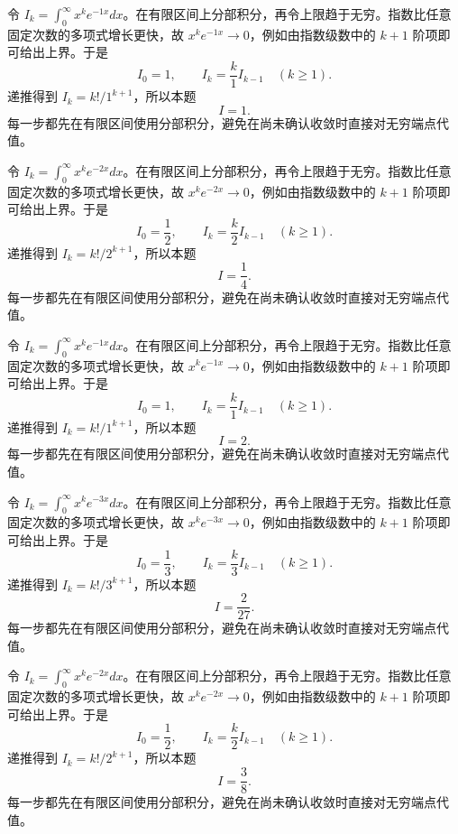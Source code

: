 \documentclass[UTF8,12pt,a4paper,fontset=fandol]{ctexart}
\begin{document}
\begin{solve}\label{ans:c19q20}
令 $I_k=\int_0^\infty x^ke^{-1x}dx$。在有限区间上分部积分，再令上限趋于无穷。指数比任意固定次数的多项式增长更快，故 $x^ke^{-1x}\to0$，例如由指数级数中的 $k+1$ 阶项即可给出上界。于是
\[
I_0=1,\qquad I_k=\frac k{1}I_{k-1}\quad(k\ge1).
\]
递推得到 $I_k=k!/1^{k+1}$，所以本题
\[
I=1.
\]
每一步都先在有限区间使用分部积分，避免在尚未确认收敛时直接对无穷端点代值。
\end{solve}

\begin{solve}\label{ans:c19q21}
令 $I_k=\int_0^\infty x^ke^{-2x}dx$。在有限区间上分部积分，再令上限趋于无穷。指数比任意固定次数的多项式增长更快，故 $x^ke^{-2x}\to0$，例如由指数级数中的 $k+1$ 阶项即可给出上界。于是
\[
I_0=\frac{1}{2},\qquad I_k=\frac k{2}I_{k-1}\quad(k\ge1).
\]
递推得到 $I_k=k!/2^{k+1}$，所以本题
\[
I=\frac{1}{4}.
\]
每一步都先在有限区间使用分部积分，避免在尚未确认收敛时直接对无穷端点代值。
\end{solve}

\begin{solve}\label{ans:c19q22}
令 $I_k=\int_0^\infty x^ke^{-1x}dx$。在有限区间上分部积分，再令上限趋于无穷。指数比任意固定次数的多项式增长更快，故 $x^ke^{-1x}\to0$，例如由指数级数中的 $k+1$ 阶项即可给出上界。于是
\[
I_0=1,\qquad I_k=\frac k{1}I_{k-1}\quad(k\ge1).
\]
递推得到 $I_k=k!/1^{k+1}$，所以本题
\[
I=2.
\]
每一步都先在有限区间使用分部积分，避免在尚未确认收敛时直接对无穷端点代值。
\end{solve}

\begin{solve}\label{ans:c19q23}
令 $I_k=\int_0^\infty x^ke^{-3x}dx$。在有限区间上分部积分，再令上限趋于无穷。指数比任意固定次数的多项式增长更快，故 $x^ke^{-3x}\to0$，例如由指数级数中的 $k+1$ 阶项即可给出上界。于是
\[
I_0=\frac{1}{3},\qquad I_k=\frac k{3}I_{k-1}\quad(k\ge1).
\]
递推得到 $I_k=k!/3^{k+1}$，所以本题
\[
I=\frac{2}{27}.
\]
每一步都先在有限区间使用分部积分，避免在尚未确认收敛时直接对无穷端点代值。
\end{solve}

\begin{solve}\label{ans:c19q24}
令 $I_k=\int_0^\infty x^ke^{-2x}dx$。在有限区间上分部积分，再令上限趋于无穷。指数比任意固定次数的多项式增长更快，故 $x^ke^{-2x}\to0$，例如由指数级数中的 $k+1$ 阶项即可给出上界。于是
\[
I_0=\frac{1}{2},\qquad I_k=\frac k{2}I_{k-1}\quad(k\ge1).
\]
递推得到 $I_k=k!/2^{k+1}$，所以本题
\[
I=\frac{3}{8}.
\]
每一步都先在有限区间使用分部积分，避免在尚未确认收敛时直接对无穷端点代值。
\end{solve}
\end{document}
